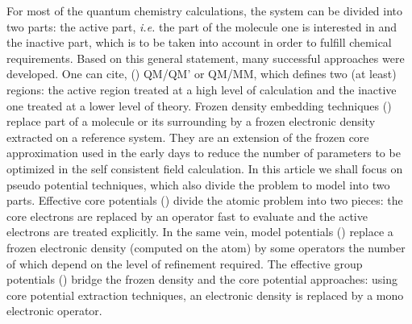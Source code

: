 \documentclass[journal=jctcce,manuscript=article]{achemso}
\begin{document}
For most of the quantum chemistry calculations, the system can be divided into two parts:
the active part, \emph{i.e.} the part of the molecule one is interested in and
the inactive part, which is to be taken into account in order to fulfill chemical requirements.
Based on this general statement, many successful approaches were developed.
One can cite, (\showCustomItem) QM/QM' or QM/MM, which defines two (at least) regions: the active region
treated at a high level of calculation and the inactive one treated at a lower level of
theory.\cite{chung_oniom_2015}
Frozen density embedding techniques (\showCustomItem) replace part of a molecule or its surrounding
by a frozen electronic density extracted on a reference system.\cite{wesolowski_frozen-density_2015}
They are an extension of the frozen core approximation used in the early days to reduce
the number of parameters to be optimized in the self consistent field calculation.
In this article we shall focus on pseudo potential techniques, which also
divide the problem to model into two parts.
Effective core potentials (\showCustomItem) divide the atomic problem into two pieces: the core electrons are
replaced by an operator fast to evaluate and the active electrons are treated
explicitly.\cite{dolg_relativistic_2012}
In the same vein, model potentials (\showCustomItem) replace a frozen electronic density (computed on the atom)
by some operators the number of which depend on the level of
refinement required.\cite{huzinaga_1994_1995}
The effective group potentials (\showCustomItem) bridge the frozen density and the core potential
approaches: using core potential extraction techniques, an electronic density is
replaced by a mono electronic operator.\cite{carissan_what_2006}
\end{document}
